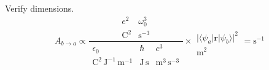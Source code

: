 Verify dimensions.
\begin{equation*}
A_{b\rightarrow a}\propto
\frac{
\begin{matrix}
e^2 & \omega_0^3
\\
\text{C}^2 & \text{s}^{-3}
\end{matrix}
}
{
\begin{matrix}
\epsilon_0 & \hbar & c^3
\\
\text{C}^2\,\text{J}^{-1}\,\text{m}^{-1}
& \text{J}\,\text{s}
& \text{m}^3\,\text{s}^{-3}
\end{matrix}
}
\times
\begin{matrix}
\\
\bigl|\langle\psi_a|\mathbf r|\psi_b\rangle\bigr|^2
\\
\text{m}^2
\end{matrix}
=\text{s}^{-1}
\end{equation*}


